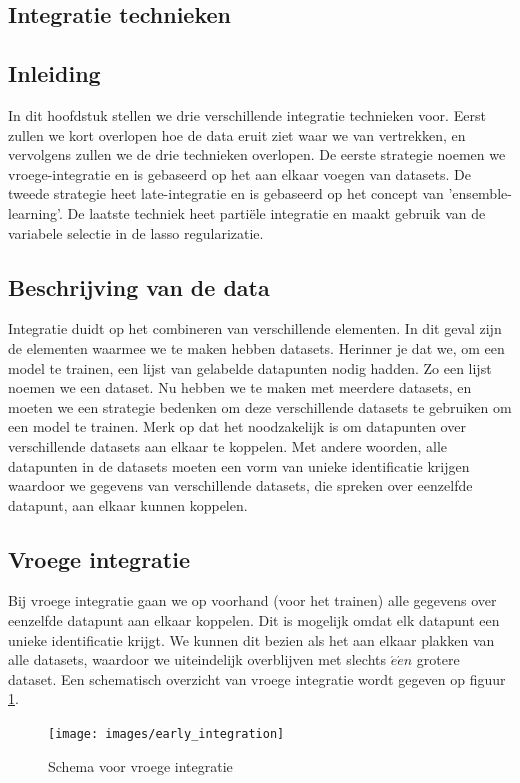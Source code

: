 \begin{abstract*}
\section{Integratie technieken}
\label{cha:D:integratie}

\subsection{Inleiding}
\label{sec:D:integratie-inleiding}
In dit hoofdstuk stellen we drie verschillende integratie technieken voor. Eerst zullen we kort overlopen hoe de data eruit ziet waar we van vertrekken, en vervolgens zullen we de drie technieken overlopen. De eerste strategie noemen we vroege-integratie en is gebaseerd op het aan elkaar voegen van datasets. De tweede strategie heet late-integratie en is gebaseerd op het concept van 'ensemble-learning'. De laatste techniek heet parti\"ele integratie en maakt gebruik van de variabele selectie in de lasso regularizatie. 

\subsection{Beschrijving van de data}
\label{sec:D:integratie-beschrijving}
Integratie duidt op het combineren van verschillende elementen. In dit geval zijn de elementen waarmee we te maken hebben datasets. Herinner je dat we, om een model te trainen, een lijst van gelabelde datapunten nodig hadden. Zo een lijst noemen we een dataset. Nu hebben we te maken met meerdere datasets, en moeten we een strategie bedenken om deze verschillende datasets te gebruiken om een model te trainen. Merk op dat het noodzakelijk is om datapunten over verschillende datasets aan elkaar te koppelen. Met andere woorden, alle datapunten in de datasets moeten een vorm van unieke identificatie krijgen waardoor we gegevens van verschillende datasets, die spreken over eenzelfde datapunt, aan elkaar kunnen koppelen.

\subsection{Vroege integratie}
\label{sec:D:integratie-vroeg}
Bij vroege integratie gaan we op voorhand (voor het trainen) alle gegevens over eenzelfde datapunt aan elkaar koppelen. Dit is mogelijk omdat elk datapunt een unieke identificatie krijgt. We kunnen dit bezien als het aan elkaar plakken van alle datasets, waardoor we uiteindelijk overblijven met slechts $\acute{e}\acute{e}n$ grotere dataset. Een schematisch overzicht van vroege integratie wordt gegeven op figuur \ref{fig:D:integratie-vroeg}.
\begin{figure}
	\centering
	\texttt{[image: images/early\_integration]}
	\caption{Schema voor vroege integratie}
	\label{fig:D:integratie-vroeg}
\end{figure}


\end{abstract*}
